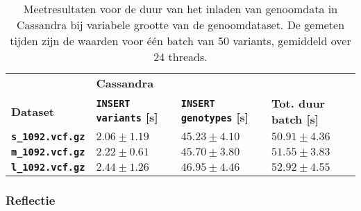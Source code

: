 \begin{table}[h]

\begin{tabular}{@{}llll@{}}
\cmidrule(l){2-4}
                  & \multicolumn{3}{|l|}{\textbf{Cassandra}}                                    \\ 
\cmidrule(l){1-4}
\multicolumn{1}{|l|}{\textbf{Dataset}}  & \multicolumn{1}{l|}{\textbf{\texttt{INSERT variants} [s]}} & \multicolumn{1}{l|}{\textbf{\texttt{INSERT genotypes} [s]}} & \multicolumn{1}{l|}{\textbf{Tot. duur batch [s]}}             \\ \midrule
\multicolumn{1}{|l|}{\textbf{\texttt{s\_1092.vcf.gz}}} & \multicolumn{1}{l|}{$2.06 \pm 1.19$} & \multicolumn{1}{l|}{$45.23 \pm 4.10$}   & \multicolumn{1}{l|}{$50.91 \pm 4.36$}\\
\multicolumn{1}{|l|}{\textbf{\texttt{m\_1092.vcf.gz}}} & \multicolumn{1}{l|}{$2.22 \pm 0.61$} & \multicolumn{1}{l|}{$45.70 \pm 3.80$}     &  \multicolumn{1}{l|}{$51.55 \pm 3.83$}  \\
\multicolumn{1}{|l|}{\textbf{\texttt{l\_1092.vcf.gz}}} & \multicolumn{1}{l|}{$2.44 \pm 1.26$} & \multicolumn{1}{l|}{$46.95 \pm 4.46$}     &  \multicolumn{1}{l|}{$52.92 \pm 4.55$}  \\
\bottomrule
\end{tabular}
\caption{Meetresultaten voor de duur van het inladen van genoomdata in Cassandra bij variabele grootte van de genoomdataset. De gemeten tijden zijn de waarden voor \'e\'en batch van 50 variants, gemiddeld over 24 threads.}
\end{table}

\subsubsection{Reflectie}

